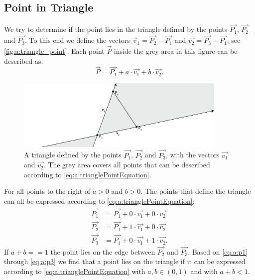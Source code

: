 \subsection*{Point in Triangle}

We try to determine if the point  lies in the triangle defined by the points $\vec{P_1}$, $\vec{P_2}$ and $\vec{P_3}$. To this end we define the vectors $\vec{v}_1 = \vec{P_2} - \vec{P_1}$ and $\vec{v_2} = \vec{P_3} - \vec{P_1}$, see \autoref{fig:a:triangle_point}. Each point $\vec{P}$ inside the grey area in this figure can be described as:
\begin{equation} \label{eq:a:trianglePointEquation}
	\vec{P} = \vec{P_1} + a \cdot \vec{v_1} + b \cdot \vec{v_2}.
\end{equation}

\begin{figure}
	\centering
	\includegraphics[width=0.9\textwidth, frame]{./img/1_triangle_point-01}
	\caption{A triangle defined by the points $\vec{P_1}$, $\vec{P_2}$ and $\vec{P_3}$, with the vectors $\vec{v_1}$ and $\vec{v_2}$. The grey area covers all points that can be described according to \eqref{eq:a:trianglePointEquation}.}
	\label{fig:a:triangle_point}
\end{figure}

For all points to the right of  $a > 0$ and $b > 0$. The points that define the triangle can all be expressed according to \eqref{eq:a:trianglePointEquation}:
\begin{align}
	\vec{P_1} &= \vec{P_1} + 0 \cdot \vec{v_1} + 0 \cdot \vec{v_2} \label{eq:a:p1}\\ 
	\vec{P_2} &= \vec{P_1} + 1 \cdot \vec{v_1} + 0 \cdot \vec{v_2} \label{eq:a:p2}\\ 
	\vec{P_3} &= \vec{P_1} + 0 \cdot \vec{v_1} + 1 \cdot \vec{v_2} \label{eq:a:p3}.
\end{align}
If $a + b == 1$ the point lies on the edge between $\vec{P_2}$ and $\vec{P_3}$. Based on \autoref{eq:a:p1} through \ref{eq:a:p3} we find that a point  lies on the triangle if it can be expressed according to \eqref{eq:a:trianglePointEquation} with $a,b \in (0,1)$ and with $a + b < 1$. 

